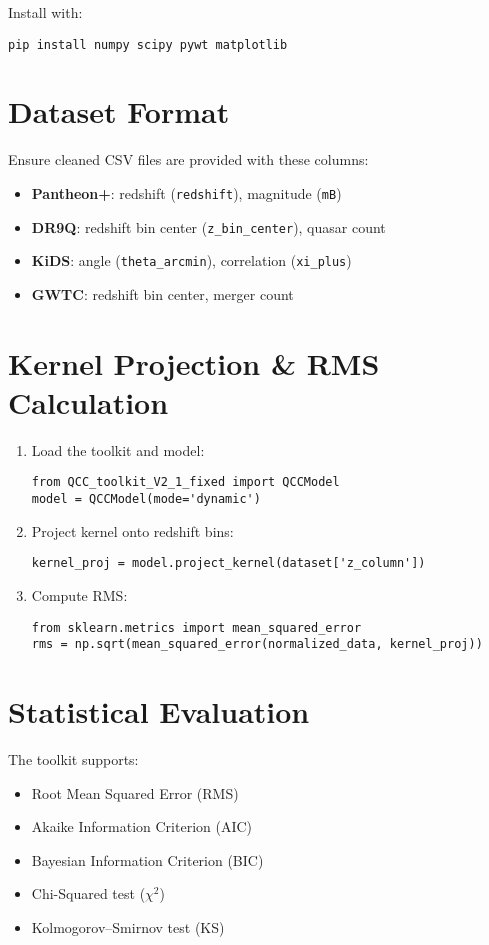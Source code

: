 \documentclass[12pt]{article}
\begin{document}
Install with:
\begin{verbatim}
pip install numpy scipy pywt matplotlib
\end{verbatim}

\section{Dataset Format}
Ensure cleaned CSV files are provided with these columns:
\begin{itemize}
\item \textbf{Pantheon+}: redshift (\texttt{redshift}), magnitude (\texttt{mB})
\item \textbf{DR9Q}: redshift bin center (\texttt{z\_bin\_center}), quasar count
\item \textbf{KiDS}: angle (\texttt{theta\_arcmin}), correlation (\texttt{xi\_plus})
\item \textbf{GWTC}: redshift bin center, merger count
\end{itemize}

\section{Kernel Projection \& RMS Calculation}
\begin{enumerate}
\item Load the toolkit and model:
\begin{verbatim}
from QCC_toolkit_V2_1_fixed import QCCModel
model = QCCModel(mode='dynamic')
\end{verbatim}
\item Project kernel onto redshift bins:
\begin{verbatim}
kernel_proj = model.project_kernel(dataset['z_column'])
\end{verbatim}
\item Compute RMS:
\begin{verbatim}
from sklearn.metrics import mean_squared_error
rms = np.sqrt(mean_squared_error(normalized_data, kernel_proj))
\end{verbatim}
\end{enumerate}

\section{Statistical Evaluation}
The toolkit supports:
\begin{itemize}
\item Root Mean Squared Error (RMS)
\item Akaike Information Criterion (AIC)
\item Bayesian Information Criterion (BIC)
\item Chi-Squared test ($\chi^2$)
\item Kolmogorov–Smirnov test (KS)
\end{itemize}
\end{document}
